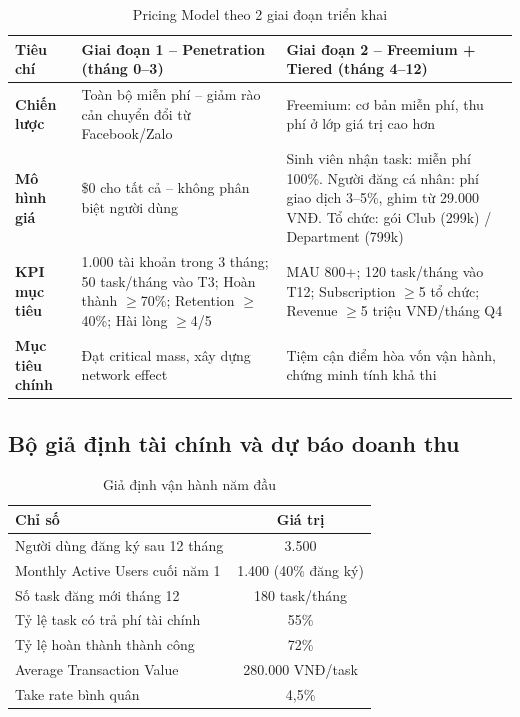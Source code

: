 \begin{table}[H]
\centering
\caption{Pricing Model theo 2 giai đoạn triển khai}
\renewcommand{\arraystretch}{1.2}
\begin{tabularx}{\textwidth}{|p{3.8cm}|X|X|}
\hline
\rowcolor{emeraldrow}
\textbf{\color{emeraldhead}Tiêu chí} &
\textbf{\color{emeraldhead}Giai đoạn 1 -- Penetration (tháng 0--3)} &
\textbf{\color{emeraldhead}Giai đoạn 2 -- Freemium + Tiered (tháng 4--12)} \\
\hline
\textbf{Chiến lược} &
  Toàn bộ miễn phí -- giảm rào cản chuyển đổi từ Facebook/Zalo &
  Freemium: cơ bản miễn phí, thu phí ở lớp giá trị cao hơn \\
\hline
\textbf{Mô hình giá} &
  \$0 cho tất cả -- không phân biệt người dùng &
  Sinh viên nhận task: miễn phí 100\%.
  Người đăng cá nhân: phí giao dịch 3--5\%, ghim từ 29.000 VNĐ.
  Tổ chức: gói Club (299k) / Department (799k) \\
\hline
\textbf{KPI mục tiêu} &
  1.000 tài khoản trong 3 tháng; 50 task/tháng vào T3;
  Hoàn thành $\geq$70\%; Retention $\geq$40\%; Hài lòng $\geq$4/5 &
  MAU 800+; 120 task/tháng vào T12; Subscription $\geq$5 tổ chức;
  Revenue $\geq$5 triệu VNĐ/tháng Q4 \\
\hline
\textbf{Mục tiêu chính} &
  Đạt critical mass, xây dựng network effect &
  Tiệm cận điểm hòa vốn vận hành, chứng minh tính khả thi \\
\hline
\end{tabularx}
\end{table}

\subsection{Bộ giả định tài chính và dự báo doanh thu}

\begin{table}[H]
\centering
\caption{Giả định vận hành năm đầu}
\begin{tabularx}{\textwidth}{|X|c|}
\hline
\textbf{Chỉ số} & \textbf{Giá trị} \\
\hline
Người dùng đăng ký sau 12 tháng & 3.500 \\
\hline
Monthly Active Users cuối năm 1  & 1.400 (40\% đăng ký) \\
\hline
Số task đăng mới tháng 12        & 180 task/tháng \\
\hline
Tỷ lệ task có trả phí tài chính & 55\% \\
\hline
Tỷ lệ hoàn thành thành công     & 72\% \\
\hline
Average Transaction Value        & 280.000 VNĐ/task \\
\hline
Take rate bình quân              & 4,5\% \\
\hline
\end{tabularx}
\end{table}

